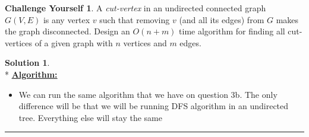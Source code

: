 \documentclass{article}
\theoremstyle{definition}
\newtheorem*{challenge}{Challenge Yourself}
\def\fline{\rule{0.75\linewidth}{0.5pt}}
\newcommand{\finishline}{\vspace{-15pt}\begin{center}\fline\end{center}}
\newtheorem*{solution*}{Solution}
\newenvironment{solution}{\begin{solution*}}{{\finishline} \end{solution*}}
\begin{document}
\begin{challenge}
	A \emph{cut-vertex} in an undirected connected graph $G(V,E)$ is any vertex $v$ such that removing $v$ (and all its edges) from $G$ makes the graph disconnected. Design an $O(n+m)$ time algorithm
	 for finding all cut-vertices of a given graph with $n$ vertices and $m$ edges. 
\end{challenge}
\begin{solution}
\hfill \bigskip\\*
	\textbf{\underline{Algorithm:}}
		\begin{itemize}
		 	\item We can run the same algorithm that we have on question 3b. The only difference will be that we will be running DFS algorithm in an undirected tree. Everything else will stay the same
		\end{itemize} 
	\end{solution}
\end{document}

